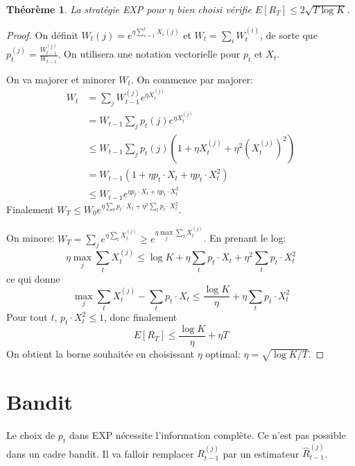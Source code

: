 \documentclass{article}
\newtheorem{theorem}{Théorème}[section]
\theoremstyle{remark}
\theoremstyle{remark}
\begin{document}
\begin{theorem}
La stratégie EXP pour $\eta$ bien choisi vérifie $E[R_T] \le 2 \sqrt{T\log K}$.
\end{theorem}

\begin{proof}
On définit $W_t{(j)}=e^{\eta \sum\limits_{s=1}^tX_s{(j)}}$ et $W_t=\sum\limits_i W_t^{(i)}$, de sorte que $p_t^{(j)}=\frac{W_{t-1}^{(j)}}{W_{t-1}}$. On utilisera une notation vectorielle pour $p_t$ et $X_t$.

On va majorer et minorer $W_t$. On commence par majorer:
\begin{equation*}
\begin{aligned}
W_t & = \sum\limits_j W_{t-1}^{(j)}e^{\eta X_t^{(j)}} \\
& = W_{t-1}\sum\limits_j p_t{(j)}e^{\eta X_t^{(j)}} \\
& \le W_{t-1}\sum\limits_j p_t{(j)}(1+\eta X_t^{(j)}+\eta^2 (X_t^{(j)})^2)\\
& = W_{t-1} (1+\eta p_t\cdot X_t+\eta p_t\cdot X_t^2)\\
& \le W_{t-1}e^{\eta p_t\cdot X_t+\eta p_t\cdot X_t^2}
\end{aligned}
\end{equation*}
Finalement $W_T\le W_0e^{\eta \sum\limits_t p_t\cdot X_t + \eta^2\sum\limits_t p_t\cdot X_t^2}$.

On minore: $W_T=\sum\limits_j e^{\eta \sum\limits_tX_t^{(j)}}\ge e^{\eta \max\limits_j \sum\limits_t X_t^{(j)}}$. En prenant le log:
\begin{equation*}
    \eta \max\limits_j \sum\limits_t X_t^{(j)} \le \log{K} + \eta \sum\limits_t p_t\cdot X_t + \eta^2 \sum\limits_t p_t\cdot X_t^2
\end{equation*}
ce qui donne
\begin{equation*}
    \max\limits_j \sum\limits_t X_t^{(j)} - \sum\limits_t p_t\cdot X_t \le \frac{\log{K}}{\eta}+\eta \sum\limits_t p_t\cdot X_t^2
\end{equation*}
Pour tout $t$, $p_t \cdot X_t^2 \le 1$, donc finalement
\begin{equation*}
    E[R_T] \le \frac{\log K}{\eta}+\eta T
\end{equation*}
On obtient la borne souhaitée en choisissant $\eta$ optimal: $\eta=\sqrt{\log{K}/T}$.
\end{proof}

\section{Bandit}
Le choix de $p_t$ dans EXP nécessite l'information complète. Ce n'est pas possible dans un cadre bandit. Il va falloir remplacer $R_{t-1}^{(j)}$ par un estimateur $\hat{R}_{t-1}^{(j)}$.
\end{document}
